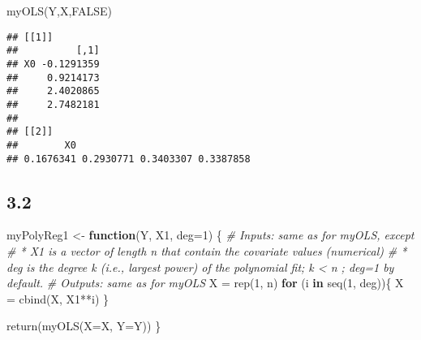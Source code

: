 \documentclass[
  11pt,
]{article}
\newenvironment{Shaded}{\begin{snugshade}}{\end{snugshade}}
\newcommand{\AttributeTok}[1]{\textcolor[rgb]{0.77,0.63,0.00}{#1}}
\newcommand{\CommentTok}[1]{\textcolor[rgb]{0.56,0.35,0.01}{\textit{#1}}}
\newcommand{\ConstantTok}[1]{\textcolor[rgb]{0.00,0.00,0.00}{#1}}
\newcommand{\ControlFlowTok}[1]{\textcolor[rgb]{0.13,0.29,0.53}{\textbf{#1}}}
\newcommand{\DecValTok}[1]{\textcolor[rgb]{0.00,0.00,0.81}{#1}}
\newcommand{\FunctionTok}[1]{\textcolor[rgb]{0.00,0.00,0.00}{#1}}
\newcommand{\NormalTok}[1]{#1}
\newcommand{\OtherTok}[1]{\textcolor[rgb]{0.56,0.35,0.01}{#1}}
\newcommand{\SpecialCharTok}[1]{\textcolor[rgb]{0.00,0.00,0.00}{#1}}
\begin{document}
\begin{Shaded}
\begin{Highlighting}[]
\FunctionTok{myOLS}\NormalTok{(Y,X,}\ConstantTok{FALSE}\NormalTok{)}
\end{Highlighting}
\end{Shaded}

\begin{verbatim}
## [[1]]
##          [,1]
## X0 -0.1291359
##     0.9214173
##     2.4020865
##     2.7482181
## 
## [[2]]
##        X0                               
## 0.1676341 0.2930771 0.3403307 0.3387858
\end{verbatim}

\hypertarget{section-1}{%
\subsection{3.2}\label{section-1}}

\begin{Shaded}
\begin{Highlighting}[]
\NormalTok{myPolyReg1 }\OtherTok{\textless{}{-}} \ControlFlowTok{function}\NormalTok{(Y, X1, }\AttributeTok{deg=}\DecValTok{1}\NormalTok{) \{}
\CommentTok{\# Inputs: same as for myOLS, except}
\CommentTok{\# * X1 is a vector of length n that contain the covariate values (numerical)}
\CommentTok{\# * deg is the degree k (i.e., largest power) of the polynomial fit; k \textless{} n ; deg=1 by default.}
\CommentTok{\# Outputs: same as for myOLS}
\NormalTok{  X }\OtherTok{=} \FunctionTok{rep}\NormalTok{(}\DecValTok{1}\NormalTok{, n)}
  \ControlFlowTok{for}\NormalTok{ (i }\ControlFlowTok{in} \FunctionTok{seq}\NormalTok{(}\DecValTok{1}\NormalTok{, deg))\{}
\NormalTok{    X }\OtherTok{=} \FunctionTok{cbind}\NormalTok{(X, X1}\SpecialCharTok{**}\NormalTok{i)}
\NormalTok{  \}}
  
  \FunctionTok{return}\NormalTok{(}\FunctionTok{myOLS}\NormalTok{(}\AttributeTok{X=}\NormalTok{X, }\AttributeTok{Y=}\NormalTok{Y))}
\NormalTok{\}}
\end{Highlighting}
\end{Shaded}
\end{document}
